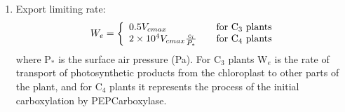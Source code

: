 \begin{enumerate}
 \item Export limiting rate:
\begin{equation}\label{eq:we}
  W_e = \left\{
  \begin{array}{l l}
    0.5 V_{cmax} & \quad \textrm{for C$_3$ plants}\\
    2 \times 10^4 V_{cmax}\frac{c_i}{P_{*}} & 
     \quad \textrm {for C$_4$ plants}
  \end{array}\right.
 \end{equation}
\noindent where P$_{*}$ is the surface air pressure (Pa). For C$_3$ plants W$_e$ is the rate of transport of photosynthetic products from the chloroplast to other parts of the plant, and for C$_4$ plants it represents the process of the initial carboxylation by PEPCarboxylase.
\end{enumerate}

